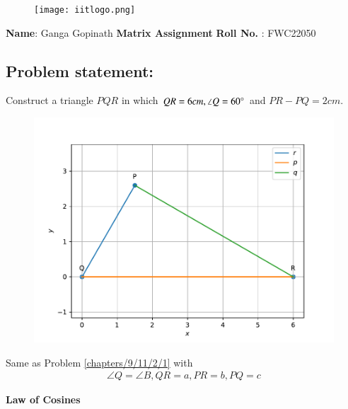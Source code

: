 \documentclass[10pt,a4paper]{article}
\begin{document}
\begin{figure}[!tbp]
 \centering
  \begin{minipage}[b]{0.4\textwidth}
  \texttt{[image: iitlogo.png]} 
  \end{minipage}
\end{figure}
\raggedright \textbf{Name}:\hspace{1mm} Ganga Gopinath\hspace{3cm} \Large \textbf{Matrix Assignment}\hspace{2.5cm} %
\normalsize \textbf{Roll No.} :\hspace{1mm} FWC22050\vspace{1cm}
\begin{multicols}{2}
\section{Problem statement:}
\fi
	Construct a triangle $PQR$ in which $QR=6cm, \angle{Q}=60\degree$ and $PR - PQ = 2cm$.
	\begin{figure}[!h]
		\centering
 \includegraphics[width=\columnwidth]{chapters/9/11/2/3/figs/line1.pdf}
		\caption{}
		\label{fig:9/11/2/3}
  	\end{figure}
	\solution  Same as Problem 
\ref{chapters/9/11/2/1} with 
\begin{align}
\angle Q = \angle B, QR = a, PR = b, PQ = c
\end{align}
\iffalse

\textbf{Law of Cosines}
\vspace{2mm}\raggedright \\


\end{multicols}
\end{document}
